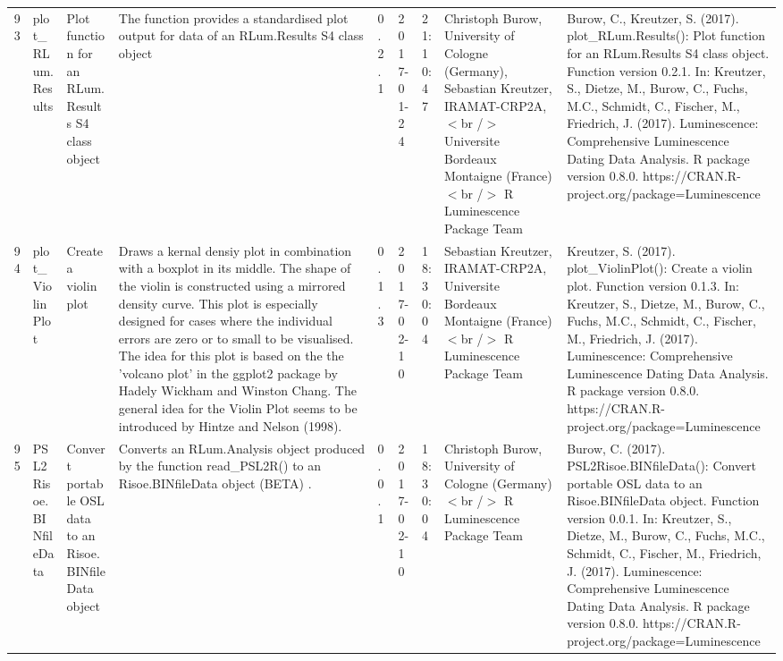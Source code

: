 \begin{table}[ht]
\begin{tabular}{rllllllll}
 \\ 
  93 & plot\_RLum.Results & Plot function for an RLum.Results S4 class object & The function provides a standardised plot output for data of an RLum.Results S4 class object & 0.2.1 & 2017-01-24 & 21:10:47
 & Christoph Burow, University of Cologne (Germany), Sebastian Kreutzer, IRAMAT-CRP2A,$<$br /$>$ Universite Bordeaux Montaigne (France)$<$br /$>$  R Luminescence Package Team & Burow, C., Kreutzer, S. (2017). plot\_RLum.Results(): Plot function for an RLum.Results S4 class object. Function version 0.2.1. In: Kreutzer, S., Dietze, M., Burow, C., Fuchs, M.C., Schmidt, C., Fischer, M., Friedrich, J. (2017). Luminescence: Comprehensive Luminescence Dating Data Analysis. R package version 0.8.0. https://CRAN.R-project.org/package=Luminescence
 \\ 
  94 & plot\_ViolinPlot & Create a violin plot & Draws a kernal densiy plot in combination with a boxplot in its middle. The shape of the violin is constructed using a mirrored density curve. This plot is especially designed for cases where the individual errors are zero or to small to be visualised. The idea for this plot is based on the the 'volcano plot' in the ggplot2 package by Hadely Wickham and Winston Chang. The general idea for the Violin Plot seems to be introduced by Hintze and Nelson (1998). & 0.1.3 & 2017-02-10 & 18:30:04
 & Sebastian Kreutzer, IRAMAT-CRP2A, Universite Bordeaux Montaigne (France)$<$br /$>$  R Luminescence Package Team & Kreutzer, S. (2017). plot\_ViolinPlot(): Create a violin plot. Function version 0.1.3. In: Kreutzer, S., Dietze, M., Burow, C., Fuchs, M.C., Schmidt, C., Fischer, M., Friedrich, J. (2017). Luminescence: Comprehensive Luminescence Dating Data Analysis. R package version 0.8.0. https://CRAN.R-project.org/package=Luminescence
 \\ 
  95 & PSL2Risoe.BINfileData & Convert portable OSL data to an Risoe.BINfileData object & Converts an  RLum.Analysis  object produced by the function  read\_PSL2R()  to an  Risoe.BINfileData  object  (BETA) . & 0.0.1 & 2017-02-10 & 18:30:04
 & Christoph Burow, University of Cologne (Germany)$<$br /$>$  R Luminescence Package Team & Burow, C. (2017). PSL2Risoe.BINfileData(): Convert portable OSL data to an Risoe.BINfileData object. Function version 0.0.1. In: Kreutzer, S., Dietze, M., Burow, C., Fuchs, M.C., Schmidt, C., Fischer, M., Friedrich, J. (2017). Luminescence: Comprehensive Luminescence Dating Data Analysis. R package version 0.8.0. https://CRAN.R-project.org/package=Luminescence
 \\ 

\end{tabular}
\end{table}
